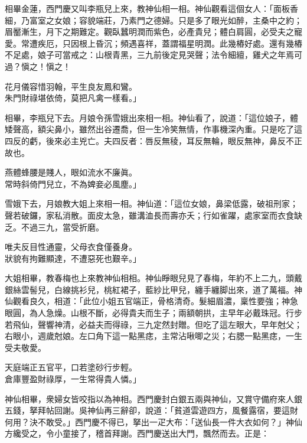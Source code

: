相畢金蓮，西門慶又叫李瓶兒上來，教神仙相一相。神仙觀看這個女人：「面板香細，{}乃富室之女娘；容貌端莊，乃素門之德婦。只是多了眼光如醉，{}主桑中之約；眉靨漸生，月下之期難定。觀臥蠶明潤而紫色，必產貴兒；體白肩圓，必受夫之寵愛。常遭疾厄，只因根上昏沉；頻遇喜祥，蓋謂福星明潤。此幾樁好處。還有幾樁不足處，娘子可當戒之：山根青黑，三九前後定見哭聲；法令細繵，雞犬之年焉可過？愼之！愼之！

\begin{myquote}
花月儀容惜羽翰，平生良友鳳和鸞。\\朱門財祿堪依倚，莫把凡禽一樣看。」
\end{myquote}

相畢，李瓶兒下去。月娘令孫雪娥出來相一相。神仙看了，說道：「這位娘子，體矮聲高，額尖鼻小，{}雖然出谷遷喬，但一生冷笑無情，作事機深內重。只是吃了這四反的虧，後來必主兇亡。夫四反者：唇反無稜，耳反無輪，眼反無神，鼻反不正故也。

\begin{myquote}
燕體蜂腰是賤人，眼如流水不廉眞。\\常時斜倚門兒立，不為婢妾必風塵。」
\end{myquote}

雪娥下去，月娘教大姐上來相一相。神仙道：「這位女娘，鼻梁低露，破祖刑家；聲若破鑼，{}家私消散。面皮太急，雖溝洫長而壽亦夭；行如雀躍，處家室而衣食缺乏。不過三九，當受折磨。

\begin{myquote}
唯夫反目性通靈，父母衣食僅養身。\\狀貌有拘難顯達，不遭惡死也艱辛。」
\end{myquote}

大姐相畢，教春梅也上來教神仙相相。神仙睜眼兒見了春梅，年約不上二九，頭戴銀絲雲髻兒，白線挑衫兒，桃紅裙子，藍紗比甲兒，纏手纏脚出來，道了萬福。神仙觀看良久，相道：「此位小姐五官端正，骨格清奇。髮細眉濃，稟性要強；神急眼圓，為人急燥。{}山根不斷，必得貴夫而生子；兩額朝拱，主早年必戴珠冠。行步若飛仙，聲響神清，必益夫而得祿，三九定然封贈。但吃了這左眼大，早年尅父；右眼小，週歲尅娘。{}左口角下這一點黑痣，主常沾啾唧之災；右腮一點黑痣，一生受夫敬愛。

\begin{myquote}
天庭端正五官平，口若塗砂行步輕。\\倉庫豐盈財祿厚，一生常得貴人憐。」
\end{myquote}

神仙相畢，衆婦女皆咬指以為神相。西門慶封白銀五兩與神仙，又賞守備府來人銀五錢，拏拜帖回謝。吳神仙再三辭卻，說道：「貧道雲遊四方，風餐露宿，要這財何用？決不敢受。」西門慶不得已，拏出一疋大布：「送仙長一件大衣如何？」神仙方纔受之，令小童接了，稽首拜謝。西門慶送出大門，飄然而去。正是：

